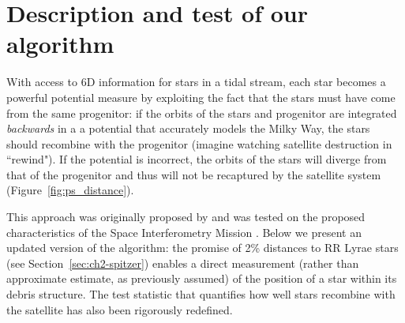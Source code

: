 \section{Description and test of our algorithm}
\label{sec:ch2-method}
With access to 6D information for stars in a tidal stream, each star becomes a
powerful potential measure by exploiting the fact that the stars must have come
from the same progenitor: if the orbits of the stars and progenitor are
integrated \emph{backwards} in a a potential that accurately models the Milky
Way, the stars should recombine with the progenitor (imagine watching satellite
destruction in ``rewind"). If the potential is incorrect, the orbits of the
stars will diverge from that of the progenitor and thus will not be recaptured
by the satellite system (Figure~\ref{fig:ps_distance}).

This approach was originally proposed by \citet{johnston99a} and was tested on
the proposed characteristics of the Space Interferometry Mission
\citep{unwin08}. Below we present an updated version of the algorithm: the
promise of 2\% distances to RR Lyrae stars (see Section~\ref{sec:ch2-spitzer})
enables a direct measurement (rather than approximate estimate, as previously
assumed) of the position of a star within its debris structure. The test
statistic that quantifies how well stars recombine with the satellite has also
been rigorously redefined.

